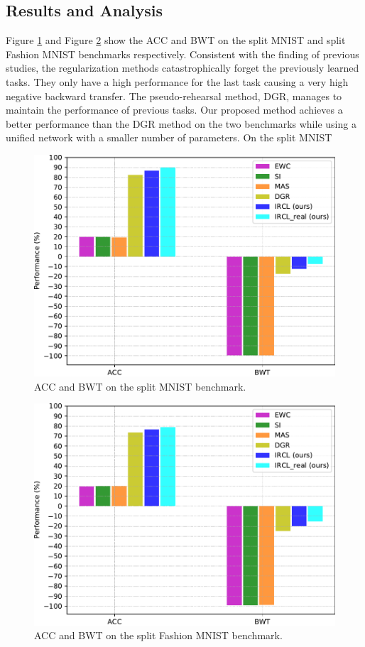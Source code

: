 \documentclass[letterpaper]{article} %
\begin{document}
\subsection{Results and Analysis}
Figure \ref{splitMNIST} and Figure \ref{splitFashionMNIST} show the ACC and BWT on the split MNIST and split Fashion MNIST benchmarks respectively. Consistent with the finding of previous studies, the regularization methods catastrophically forget the previously learned tasks. They only have a high performance for the last task causing a very high negative backward transfer. The pseudo-rehearsal method, DGR, manages to maintain the performance of previous tasks. Our proposed method achieves a better performance than the DGR method on the two benchmarks while using a unified network with a smaller number of parameters. On the split MNIST
\begin{figure}[hb]
\centering
\includegraphics[width=0.95\columnwidth]{pic/mnist_acc_bwt.pdf}
\caption{ACC and BWT on the split MNIST benchmark.}
\label{splitMNIST}
\end{figure}
\begin{figure}[ht]
\centering
\includegraphics[width=0.95\columnwidth]{pic/fashion_mnist_acc_bwt.pdf}
\caption{ACC and BWT on the split Fashion MNIST benchmark.}
\label{splitFashionMNIST}
\end{figure}
\end{document}
